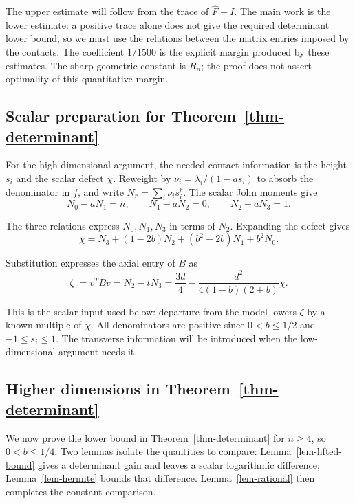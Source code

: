 The upper estimate will follow from the trace of $\widehat F-I$. The main work
is the lower estimate: a positive trace alone does not give the required determinant lower bound,
so we must use the relations between the matrix entries imposed by the contacts.
The coefficient $1/1500$ is the explicit margin produced by these estimates.
The sharp geometric constant is $R_n$; the proof does not assert optimality
of this quantitative margin.

\subsection{Scalar preparation for Theorem~\ref{thm-determinant}}\label{sec:8.1}

For the high-dimensional argument, the needed contact information is the
height $s_i$ and the scalar defect $\chi$. Reweight by
$\nu_i=\lambda_i/(1-as_i)$ to absorb the denominator in $f$, and write
$N_r=\sum_i\nu_i s_i^r$. The scalar John moments give
\begin{equation}\label{eq:8.5}
N_0-aN_1=n,\qquad N_1-aN_2=0,\qquad N_2-aN_3=1.
\end{equation}

The three relations express $N_0,N_1,N_3$ in terms of $N_2$.
Expanding the defect gives
\begin{equation}\label{eq:8.6}
\chi=N_3+(1-2b)N_2+(b^2-2b)N_1+b^2N_0.
\end{equation}

Substitution expresses the axial entry of $B$ as
\begin{equation}\label{eq:8.7}
\zeta:=v^TBv=N_2-tN_3
=\frac{3d}{4}-\frac{d^2}{4(1-b)(2+b)}\chi.
\end{equation}

This is the scalar input used below: departure from the model lowers
$\zeta$ by a known multiple of $\chi$. All denominators are positive since
$0<b\le1/2$ and $-1\le s_i\le1$. The transverse information will be introduced
when the low-dimensional argument needs it.


\subsection{Higher dimensions in Theorem~\ref{thm-determinant}}\label{sec:8.2}

We now prove the lower bound in Theorem~\ref{thm-determinant} for $n\ge4$, so $0<b\le1/4$.
Two lemmas isolate the quantities to compare: Lemma~\ref{lem-lifted-bound} gives a determinant
gain and leaves a scalar logarithmic difference; Lemma~\ref{lem-hermite} bounds that
difference. Lemma~\ref{lem-rational} then completes the constant comparison.

